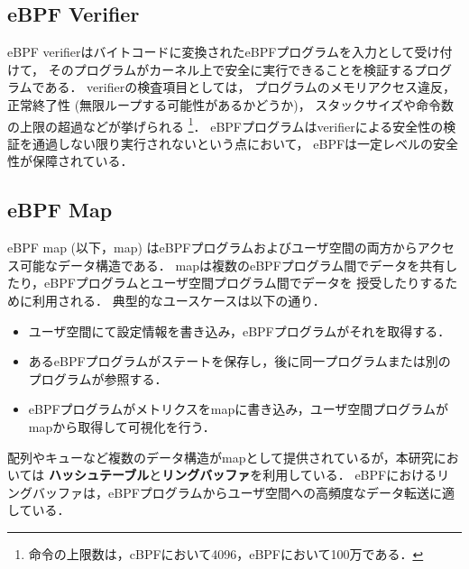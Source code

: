 \subsection{eBPF Verifier}
eBPF verifierはバイトコードに変換されたeBPFプログラムを入力として受け付けて，
そのプログラムがカーネル上で安全に実行できることを検証するプログラムである．
verifierの検査項目としては，
プログラムのメモリアクセス違反，正常終了性 (無限ループする可能性があるかどうか)，
スタックサイズや命令数の上限の超過などが挙げられる
\footnote{命令の上限数は，cBPFにおいて4096，eBPFにおいて100万である．}．
eBPFプログラムはverifierによる安全性の検証を通過しない限り実行されないという点において，
eBPFは一定レベルの安全性が保障されている．

\subsection{eBPF Map}
eBPF map (以下，map) はeBPFプログラムおよびユーザ空間の両方からアクセス可能なデータ構造である．
mapは複数のeBPFプログラム間でデータを共有したり，eBPFプログラムとユーザ空間プログラム間でデータを
授受したりするために利用される．
典型的なユースケースは以下の通り\cite{learning-eBPF}．
\begin{itemize}
  \item ユーザ空間にて設定情報を書き込み，eBPFプログラムがそれを取得する．
  \item あるeBPFプログラムがステートを保存し，後に同一プログラムまたは別のプログラムが参照する．
  \item eBPFプログラムがメトリクスをmapに書き込み，ユーザ空間プログラムがmapから取得して可視化を行う．
\end{itemize}
配列やキューなど複数のデータ構造がmapとして提供されているが，本研究においては
\textbf{ハッシュテーブル}と\textbf{リングバッファ}を利用している．
eBPFにおけるリングバッファは，eBPFプログラムからユーザ空間への高頻度なデータ転送に適している．
